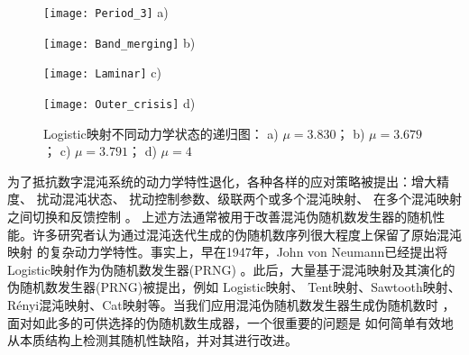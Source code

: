 \begin{figure}[!htb]
\centering
\begin{minipage}{\TwoImW}
\centering
\texttt{[image: Period\_3]}
a)
\end{minipage}\hspace{1mm}
\begin{minipage}{\TwoImW}
\centering
\texttt{[image: Band\_merging]}
b)
\end{minipage}
\begin{minipage}{\TwoImW}
\centering
\texttt{[image: Laminar]}
c)
\end{minipage}\hspace{1mm}
\begin{minipage}{\TwoImW}
\centering
\texttt{[image: Outer\_crisis]}
d)
\end{minipage}
\caption{Logistic映射不同动力学状态的递归图： a) $\mu=3.830$； b) $\mu=3.679$； c) $\mu=3.791$； d) $\mu=4$}
\label{fig:RP}
\end{figure}

为了抵抗数字混沌系统的动力学特性退化，各种各样的应对策略被提出：增大精度、
扰动混沌状态、
扰动控制参数、级联两个或多个混沌映射、
在多个混沌映射之间切换和反馈控制
。
上述方法通常被用于改善混沌伪随机数发生器的随机性能。许多研究者认为通过混沌迭代生成的伪随机数序列很大程度上保留了原始混沌映射
的复杂动力学特性。事实上，早在1947年，John von Neumann已经提出将Logistic映射作为伪随机数发生器(PRNG)
。此后，大量基于混沌映射及其演化的伪随机数发生器(PRNG)被提出，例如
Logistic映射、
Tent映射、Sawtooth映射、
R{\'e}nyi混沌映射、Cat映射等。当我们应用混沌伪随机数发生器生成伪随机数时
，面对如此多的可供选择的伪随机数生成器，一个很重要的问题是
如何简单有效地从本质结构上检测其随机性缺陷，并对其进行改进。

